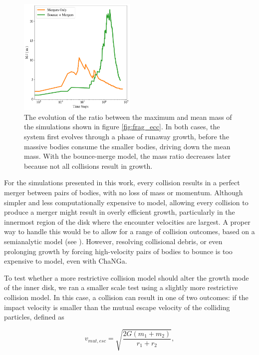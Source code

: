 \documentclass[twocolumn]{aastex63}
\begin{document}
\begin{figure}
\begin{center}
    \includegraphics[width=0.5\textwidth]{figures/frag_evo.png}
    \caption{The evolution of the ratio between the maximum and mean mass of the simulations shown in figure \ref{fig:frag_ecc}. 
    In both cases, the system first evolves through a phase of runaway growth, before the massive bodies consume the smaller 
    bodies, driving down the mean mass. With the bounce-merge model, the mass ratio decreases later because not all collisions 
    result in growth.\label{fig:frag_evo}}
\end{center}
\end{figure}

For the simulations presented in this work, every collision results in a perfect merger between pairs of bodies, with no loss
of mass or momentum. Although simpler and less computationally expensive to model, allowing every collision to produce a
merger might result in overly efficient growth, particularly in the innermost region of the disk where the encounter velocities are 
largest. A proper way to handle this would be to allow for a range of collision outcomes, based on a semianalytic model (see 
\citet{leinhardt12}). However, resolving collisional debris, or even prolonging growth by forcing high-velocity pairs of bodies to 
bounce is too expensive to model, even with {\sc ChaNGa}.

To test whether a more restrictive collision model should alter the growth mode of the inner disk, we ran a smaller scale test 
using a slightly more restrictive collision model. In this case, a collision can result in one of two outcomes: if the impact velocity is 
smaller than the mutual escape velocity of the colliding particles, defined as

\begin{equation}\label{eq:v_mut}
	v_{mut, esc} = \sqrt{\frac{2 G (m_{1} + m_{2})}{r_{1} + r_{2}}},
\end{equation}
\end{document}
